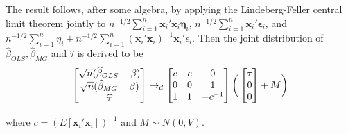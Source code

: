 \documentclass[11pt]{article}
\begin{document}
The result follows, after some algebra, by applying the Lindeberg-Feller central limit theorem jointly to $n^{-1/2}\sum_{i=1}^{n} \mathbf{x}_i'\mathbf{x}_i\mathbf{\eta}_i $, $n^{-1/2}\sum_{i=1}^{n} \mathbf{x}_i'\mathbf{\epsilon}_i$, and $n^{-1/2} \sum_{i=1}^n \eta_i + n^{-1/2} \sum_{i=1}^n (\mathbf{x}_i'\mathbf{x}_i)^{-1} \mathbf{x}_i'\epsilon_i $. Then the joint distribution of $\widehat{\beta}_{OLS}, \widehat{\beta}_{MG}$ and $\widehat{\tau}$ is derived to be 
\[
 \begin{bmatrix}
\sqrt{n} (\widehat{\beta}_{OLS} - \beta)\\
\sqrt{n} (\widehat{\beta}_{MG} - \beta)\\
\widehat{\tau}
\end{bmatrix} \rightarrow_d  \begin{bmatrix}
c & c & 0\\
0 &0 & 1\\
1 & 1& -c^{-1}
\end{bmatrix} \bigg(\begin{bmatrix}
\tau\\
0\\
0
\end{bmatrix}   + M  \bigg)\\
\]

where $c = (E[\mathbf{x}_i' \mathbf{x}_i])^{-1}$ and $M \sim N(0, V)$.
\end{document}
